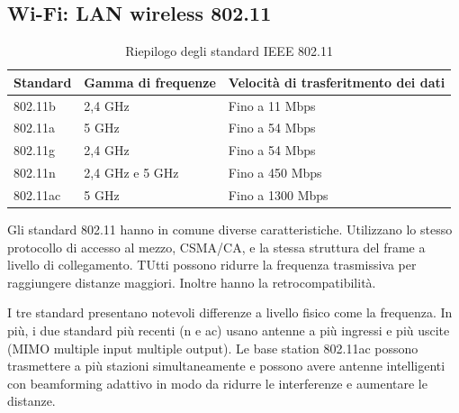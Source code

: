 \documentclass[11pt,a4paper]{article}
\begin{document}
{\subsection{Wi-Fi: LAN wireless 802.11}
\begin{table}[]
	\begin{tabular}{|l|l|l|}
		\hline
		\multicolumn{1}{|c|}{\textbf{Standard}} & \multicolumn{1}{c|}{\textbf{Gamma di frequenze}} & \multicolumn{1}{c|}{\textbf{Velocità di trasferitmento dei dati}} \\ \hline
		802.11b                                 & 2,4 GHz                                          & Fino a 11 Mbps                                                    \\ \hline
		802.11a                                 & 5 GHz                                            & Fino a 54 Mbps                                                    \\ \hline
		802.11g                                 & 2,4 GHz                                          & Fino a 54 Mbps                                                    \\ \hline
		802.11n                                 & 2,4 GHz e 5 GHz                                  & Fino a 450 Mbps                                                   \\ \hline
		802.11ac                                & 5 GHz                                            & Fino a 1300 Mbps                                                  \\ \hline
	\end{tabular}
	\caption{Riepilogo degli standard IEEE 802.11}
	\label{tab: 004}
\end{table}
Gli standard 802.11 hanno in comune diverse caratteristiche. Utilizzano lo stesso protocollo di accesso al mezzo, CSMA/CA, e la stessa struttura del frame a livello di collegamento. TUtti possono ridurre la frequenza trasmissiva per raggiungere distanze maggiori. Inoltre hanno la retrocompatibilità.

I tre standard presentano notevoli differenze a livello fisico come la frequenza. In più, i due standard più recenti (n e ac) usano antenne a più ingressi e più uscite (MIMO multiple input multiple output). Le base station 802.11ac possono trasmettere a più stazioni simultaneamente e possono avere antenne intelligenti con beamforming adattivo in modo da ridurre le interferenze e aumentare le distanze.

}
\end{document}
